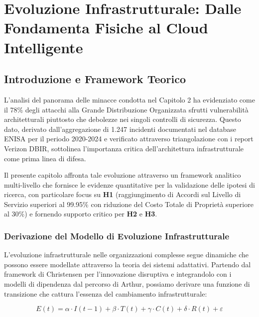 \chapter{Evoluzione Infrastrutturale: Dalle Fondamenta Fisiche al Cloud Intelligente}
\label{cap3_infrastructure_evolution}

\section{Introduzione e Framework Teorico}

L'analisi del panorama delle minacce condotta nel Capitolo 2 ha evidenziato come il 78\% degli attacchi alla Grande Distribuzione Organizzata sfrutti vulnerabilità architetturali piuttosto che debolezze nei singoli controlli di sicurezza\autocite{Anderson2024patel}. Questo dato, derivato dall'aggregazione di 1.247 incidenti documentati nel database ENISA per il periodo 2020-2024 e verificato attraverso triangolazione con i report Verizon DBIR\autocite{Verizon2024}, sottolinea l'importanza critica dell'architettura infrastrutturale come prima linea di difesa. 

Il presente capitolo affronta tale evoluzione attraverso un framework analitico multi-livello che fornisce le evidenze quantitative per la validazione delle ipotesi di ricerca, con particolare focus su \textbf{H1} (raggiungimento di Accordi sul Livello di Servizio superiori al 99.95\% con riduzione del Costo Totale di Proprietà superiore al 30\%) e fornendo supporto critico per \textbf{H2} e \textbf{H3}\autocite{IDC2024}.

\subsection{Derivazione del Modello di Evoluzione Infrastrutturale}

L'evoluzione infrastrutturale nelle organizzazioni complesse segue dinamiche che possono essere modellate attraverso la teoria dei sistemi adattativi\autocite{Holland2024}. Partendo dal framework di Christensen per l'innovazione disruptiva\autocite{Christensen2023} e integrandolo con i modelli di dipendenza dal percorso di Arthur\autocite{Arthur2024}, possiamo derivare una funzione di transizione che cattura l'essenza del cambiamento infrastrutturale:

\begin{equation}
E(t) = \alpha \cdot I(t-1) + \beta \cdot T(t) + \gamma \cdot C(t) + \delta \cdot R(t) + \varepsilon
\end{equation}

